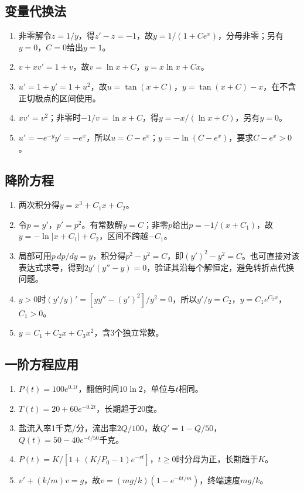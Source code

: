 \documentclass[11pt,a4paper,fontset=fandol]{ctexrep}
\begin{document}
\subsection{变量代换法}
\begin{enumerate}
\item 非零解令$z=1/y$，得$z'-z=-1$，故$y=1/(1+Ce^x)$，分母非零；另有$y=0$，$C=0$给出$y=1$。
\item $v+xv'=1+v$，故$v=\ln x+C$，$y=x\ln x+Cx$。
\item $u'=1+y'=1+u^2$，故$u=\tan(x+C)$，$y=\tan(x+C)-x$，在不含正切极点的区间使用。
\item $xv'=v^2$；非零时$-1/v=\ln x+C$，得$y=-x/(\ln x+C)$，另有$y=0$。
\item $u'=-e^{-y}y'=-e^x$，所以$u=C-e^x$；$y=-\ln(C-e^x)$，要求$C-e^x>0$。
\end{enumerate}
\subsection{降阶方程}
\begin{enumerate}
\item 两次积分得$y=x^3+C_1x+C_2$。
\item 令$p=y'$，$p'=p^2$。有常数解$y=C$；非零$p$给出$p=-1/(x+C_1)$，故$y=-\ln|x+C_1|+C_2$，区间不跨越$-C_1$。
\item 局部可用$p\,dp/dy=y$，积分得$p^2-y^2=C$，即$(y')^2-y^2=C$。也可直接对该表达式求导，得到$2y'(y''-y)=0$，验证其沿每个解恒定，避免转折点代换问题。
\item $y>0$时$(y'/y)'=[yy''-(y')^2]/y^2=0$，所以$y'/y=C_2$，$y=C_1e^{C_2x}$，$C_1>0$。
\item $y=C_1+C_2x+C_3x^2$，含3个独立常数。
\end{enumerate}
\subsection{一阶方程应用}
\begin{enumerate}
\item $P(t)=100e^{0.1t}$，翻倍时间$10\ln2$，单位与$t$相同。
\item $T(t)=20+60e^{-0.2t}$，长期趋于20度。
\item 盐流入率1千克/分，流出率$2Q/100$，故$Q'=1-Q/50$，$Q(t)=50-40e^{-t/50}$千克。
\item $P(t)=K/[1+(K/P_0-1)e^{-rt}]$，$t\ge0$时分母为正，长期趋于$K$。
\item $v'+(k/m)v=g$，故$v=(mg/k)(1-e^{-kt/m})$，终端速度$mg/k$。
\end{enumerate}
\end{document}
